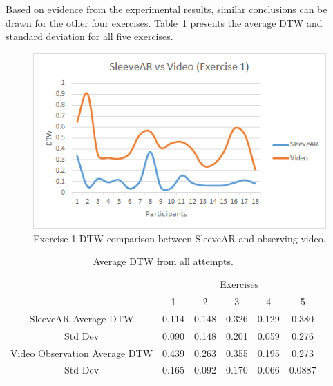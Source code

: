 Based on evidence from the experimental results, similar conclusions can be drawn for the other four exercises. Table~\ref{table:dtwavg} presents the average DTW and standard deviation for all five exercises.

\begin{figure}[!t]
    \centering
    \includegraphics{imgs/results/sleevearVSvideoEx1.png}
    \caption{Exercise 1 DTW comparison between SleeveAR and observing video.}
    \label{fig:sleevearVSvideoEx1}
\end{figure}



\begin{table}[!t]
\centering
\begin{tabular}{c|c|c|c|c|c|}
\cline{2-6}
\multicolumn{1}{l|}{}                               & \multicolumn{5}{c|}{Exercises}             \\ \cline{2-6} 
                                                    & 1      & 2      & 3      & 4      & 5      \\ \hline
\multicolumn{1}{|c|}{SleeveAR Average DTW}          & 0.114 & 0.148 & 0.326 & 0.129 & 0.380 \\ \hline
\multicolumn{1}{|c|}{Std Dev}                       & 0.090 & 0.148  & 0.201 & 0.059 & 0.276 \\ \hline
\multicolumn{1}{|c|}{Video Observation Average DTW} & 0.439  & 0.263  & 0.355 & 0.195 & 0.273 \\ \hline
\multicolumn{1}{|c|}{Std Dev}                       & 0.165 & 0.092 & 0.170 & 0.066 & 0.0887 \\ \hline
\end{tabular}
\caption{Average DTW from all attempts.}
\label{table:dtwavg}
\end{table}


